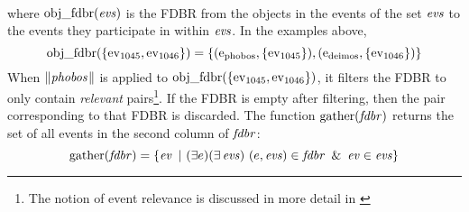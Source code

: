 \documentclass[../main.tex]{subfiles}
\begin{document}
\begin{refsection}
\begin{multline*}
\end{multline*}
where $\operatorname{obj\_fdbr}({\operatorname{\mathit{evs}}})$ is the FDBR from the objects in the events of the set $\operatorname{\mathit{evs}}$ to the events they participate in within $\operatorname{\mathit{evs}}$.  In the examples above,
\begin{equation*}
	\operatorname{obj\_fdbr}({\{\operatorname{ev}_{1045}, \operatorname{ev}_{1046}\}}) = \{(\mathrm{e}_{\operatorname{phobos}}, \{\operatorname{ev}_{1045}\}), (\mathrm{e}_{\operatorname{deimos}}, \{\operatorname{ev}_{1046}\}) \}
\end{equation*}
When $\lVert\textit{phobos\hspace{0.1em}}\rVert$ is applied to $\operatorname{obj\_fdbr}({\{\operatorname{ev}_{1045}, \operatorname{ev}_{1046}\}})$, it filters the FDBR
to only contain {\em relevant} pairs\footnote{The notion of event relevance is discussed in more detail in \cite{peelar2016accommodating}}.  If the FDBR is empty after filtering, then the pair corresponding to that FDBR is discarded.
The function $\operatorname{gather}({\operatorname{\mathit{fdbr}}})$ returns the set of all events in the second column of $\operatorname{\mathit{fdbr}}$:
\begin{equation*}
	\gatherevs{\opit{fdbr}} = \{ \opit{ev}\ |\ (\exists e)(\exists \evs)\ (e, \evs) \in \opit{fdbr}\ \&\ \opit{ev} \in \evs \}
\end{equation*}


\end{refsection}
\end{document}
